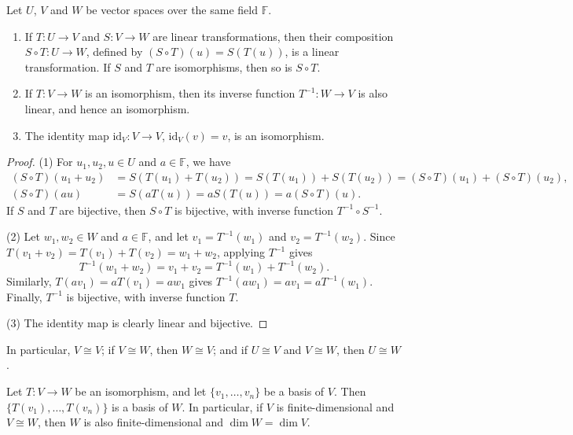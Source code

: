 \begin{lemma}\label{L1-lem:composition}
    Let $U$, $V$ and $W$ be vector spaces over the same field $\mathbb{F}$.
    \begin{enumerate}
        \item If $T: U \to V$ and $S: V \to W$ are linear transformations, then their composition $S \circ T: U \to W$, defined by $(S \circ T)(u) = S(T(u))$, is a linear transformation. If $S$ and $T$ are isomorphisms, then so is $S \circ T$.
        \item If $T: V \to W$ is an isomorphism, then its inverse function $T^{-1}: W \to V$ is also linear, and hence an isomorphism.
        \item The identity map $\mathrm{id}_V: V \to V$, $\mathrm{id}_V(v) = v$, is an isomorphism.
    \end{enumerate}
\end{lemma}

\begin{proof}
    (1) For $u_1, u_2, u \in U$ and $a \in \mathbb{F}$, we have
    \begin{align*}
        (S \circ T)(u_1 + u_2) &= S(T(u_1) + T(u_2)) = S(T(u_1)) + S(T(u_2)) = (S \circ T)(u_1) + (S \circ T)(u_2), \\
        (S \circ T)(a u) &= S(a T(u)) = a S(T(u)) = a (S \circ T)(u).
    \end{align*}
    If $S$ and $T$ are bijective, then $S \circ T$ is bijective, with inverse function $T^{-1} \circ S^{-1}$.

    (2) Let $w_1, w_2 \in W$ and $a \in \mathbb{F}$, and let $v_1 = T^{-1}(w_1)$ and $v_2 = T^{-1}(w_2)$. Since $T(v_1 + v_2) = T(v_1) + T(v_2) = w_1 + w_2$, applying $T^{-1}$ gives
    \[T^{-1}(w_1 + w_2) = v_1 + v_2 = T^{-1}(w_1) + T^{-1}(w_2).\]
    Similarly, $T(a v_1) = a T(v_1) = a w_1$ gives $T^{-1}(a w_1) = a v_1 = a T^{-1}(w_1)$. Finally, $T^{-1}$ is bijective, with inverse function $T$.

    (3) The identity map is clearly linear and bijective.
\end{proof}

In particular, $V \cong V$; if $V \cong W$, then $W \cong V$; and if $U \cong V$ and $V \cong W$, then $U \cong W$.

\begin{proposition}\label{L1-prop:iso-basis}
    Let $T: V \to W$ be an isomorphism, and let $\{v_1, \ldots, v_n\}$ be a basis of $V$. Then $\{T(v_1), \ldots, T(v_n)\}$ is a basis of $W$. In particular, if $V$ is finite-dimensional and $V \cong W$, then $W$ is also finite-dimensional and $\dim W = \dim V$.
\end{proposition}

